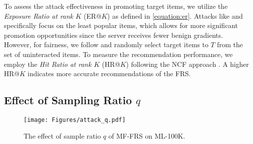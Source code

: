 To assess the attack effectiveness in promoting target items, we utilize the \emph{Exposure Ratio at rank $K$} (ER@$K$) as defined in \cref{equation:er}. Attacks like \PIP{} and \AHUM{} specifically focus on the least popular items, which allows for more significant promotion opportunities since the server receives fewer benign gradients. However, for fairness, we follow \FRA{} \cite{fedrecattack} and randomly select target items to ${T}$ from the set of uninteracted items.
To measure the recommendation performance, we employ the \emph{Hit Ratio at rank $K$} (HR@$K$) following the NCF approach \cite{NCF}. A higher HR@$K$ indicates more accurate recommendations of the FRS.

\subsection{Effect of Sampling Ratio $q$}

\begin{figure}[!htbp]
\centering
    \label{subfig:ipe_uea_compare_mf_ml-1m}
    \texttt{[image: Figures/attack\_q.pdf]}
    \caption{The effect of sample ratio $q$ of MF-FRS on ML-100K.}
    \label{fig:effect_of_q}
\end{figure}
\smallskip

